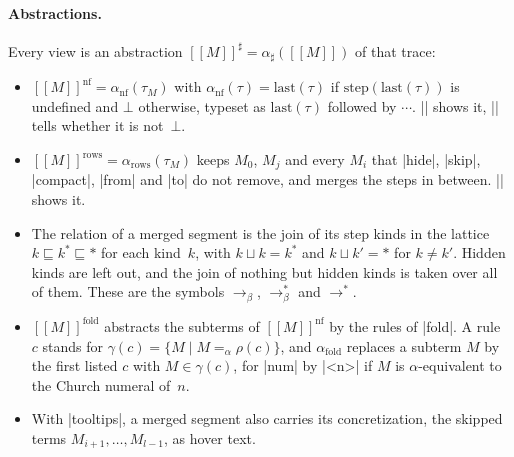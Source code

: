 \documentclass[parskip=half,english,numbers=noenddot,footnotes=nomultiple,oneside]{scrartcl}
\begin{document}
\paragraph{Abstractions.} Every view is an abstraction \([\![M]\!]^\sharp = \alpha_\sharp([\![M]\!])\) of that trace:
\begin{itemize}
   \item \([\![M]\!]^{\mathrm{nf}} = \alpha_{\mathrm{nf}}(\tau_M)\) with \(\alpha_{\mathrm{nf}}(\tau) = \mathrm{last}(\tau)\) if \(\mathrm{step}(\mathrm{last}(\tau))\) is undefined and \(\bot\) otherwise, typeset as \(\mathrm{last}(\tau)\) followed by \(\cdots\). |\lcNormalForm| shows it, |\iflcNormalFormReached| tells whether it is not~\(\bot\).
   \item \([\![M]\!]^{\mathrm{rows}} = \alpha_{\mathrm{rows}}(\tau_M)\) keeps \(M_0\), \(M_j\) and every \(M_i\) that |hide|, |skip|, |compact|, |from| and |to| do not remove, and merges the steps in between. |\lcReduce| shows it.
   \item The relation of a merged segment is the join of its step kinds in the lattice \(k \sqsubseteq k^* \sqsubseteq {*}\) for each kind~\(k\), with \(k \sqcup k = k^*\) and \(k \sqcup k' = {*}\) for \(k \neq k'\). Hidden kinds are left out, and the join of nothing but hidden kinds is taken over all of them. These are the symbols \(\to_\beta\), \(\to_\beta^*\) and \(\to^*\).
   \item \([\![M]\!]^{\mathrm{fold}}\) abstracts the subterms of \([\![M]\!]^{\mathrm{nf}}\) by the rules of |fold|. A rule~\(c\) stands for \(\gamma(c) = \{ M \mid M =_\alpha \rho(c) \}\), and \(\alpha_{\mathrm{fold}}\) replaces a subterm \(M\) by the first listed \(c\) with \(M \in \gamma(c)\), for |num| by |\num{<n>}| if \(M\) is \(\alpha\)-equivalent to the Church numeral of~\(n\).
   \item With |tooltips|, a merged segment also carries its concretization, the skipped terms \(M_{i+1}, \dots, M_{l-1}\), as hover text.
\end{itemize}
\end{document}

